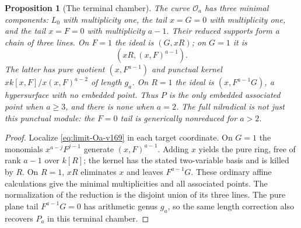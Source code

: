 \documentclass[11pt,reqno]{amsart}
\numberwithin{equation}{section}
\newtheorem{proposition}[theorem]{Proposition}
\theoremstyle{definition}\newtheorem{definition}[theorem]{Definition}
\theoremstyle{remark}\newtheorem{remark}[theorem]{Remark}
\begin{document}
\begin{proposition}[The terminal chamber]\label{prop:terminal-v169}
The curve $\mathcal O_a$ has three minimal components: $L_0$ with
multiplicity one, the tail $x=G=0$ with multiplicity one, and the
tail $x=F=0$ with multiplicity $a-1$. Their reduced supports form a
chain of three lines. On $F=1$ the ideal is $(G,xR)$; on $G=1$ it is
\[
 (xR,(x,F)^{a-1}).
\]
The latter has pure quotient $(x,F^{a-1})$ and punctual kernel
$xk[x,F]/x(x,F)^{a-2}$ of length $g_a$. On $R=1$ the ideal is
$(x,F^{a-1}G)$, a hypersurface with no embedded point. Thus $P$ is
the only embedded associated point when $a\geq3$, and there is none
when $a=2$. The full nilradical is not just this punctual module:
the $F=0$ tail is generically nonreduced for $a>2$.
\end{proposition}
\begin{proof}
Localize \eqref{eq:limit-Oa-v169} in each target coordinate. On $G=1$
the monomials $x^{a-j}F^{j-1}$ generate $(x,F)^{a-1}$.
Adding $x$ yields the pure ring, free of rank $a-1$ over $k[R]$;
the kernel has the stated two-variable basis and is killed by $R$.
On $R=1$, $xR$ eliminates $x$ and leaves $F^{a-1}G$.
These ordinary affine calculations give the minimal multiplicities
and all associated points. The normalization of the reduction is the
disjoint union of its three lines. The pure plane tail
$F^{a-1}G=0$ has arithmetic genus $g_a$, so the same length correction
also recovers $P_a$ in this terminal chamber.
\end{proof}
\end{document}
